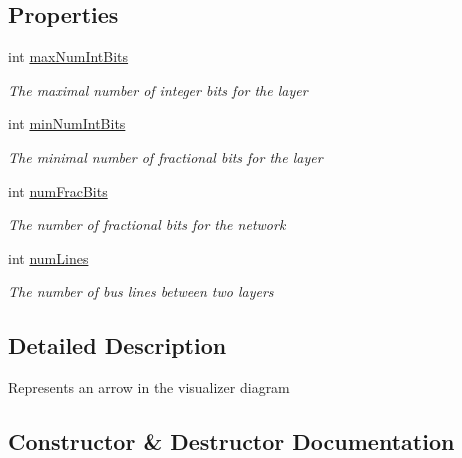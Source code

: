 \subsection*{Properties}
\begin{DoxyCompactItemize}
\item 
int \hyperlink{class_n_n_gen_1_1_visualizer_arrow_abba2d8807b5dd4b0e531a7e614c015a1}{max\+Num\+Int\+Bits}
\begin{DoxyCompactList}\small\item\em The maximal number of integer bits for the layer \end{DoxyCompactList}\item 
int \hyperlink{class_n_n_gen_1_1_visualizer_arrow_a4a80259866c98226a478e827ad55d128}{min\+Num\+Int\+Bits}
\begin{DoxyCompactList}\small\item\em The minimal number of fractional bits for the layer \end{DoxyCompactList}\item 
int \hyperlink{class_n_n_gen_1_1_visualizer_arrow_ac9df0a9dfef7922cdb08d23fbe598ede}{num\+Frac\+Bits}
\begin{DoxyCompactList}\small\item\em The number of fractional bits for the network \end{DoxyCompactList}\item 
int \hyperlink{class_n_n_gen_1_1_visualizer_arrow_af443e27a47d657b4f030aa51275f8ad2}{num\+Lines}
\begin{DoxyCompactList}\small\item\em The number of bus lines between two layers \end{DoxyCompactList}\end{DoxyCompactItemize}


\subsection{Detailed Description}
Represents an arrow in the visualizer diagram 



\subsection{Constructor \& Destructor Documentation}
\hypertarget{class_n_n_gen_1_1_visualizer_arrow_a94d9f0de399b32b1b93f355a6fb545e9}{}
